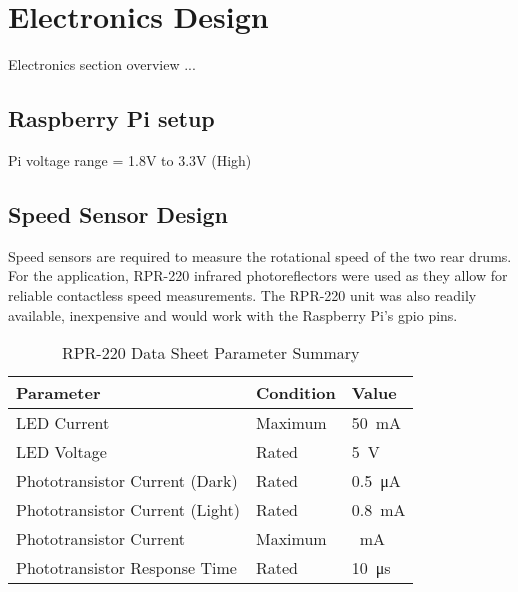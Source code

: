 \newpage

\chapter{Electronics Design}

Electronics section overview ...

\newpage

\section{Raspberry Pi setup}

Pi voltage range = 1.8V to 3.3V (High)

\newpage

\section{Speed Sensor Design}

Speed sensors are required to measure the rotational speed of the two rear drums. For the application, RPR-220 infrared photoreflectors were used as they allow for reliable contactless speed measurements. The RPR-220 unit was also readily available, inexpensive and would work with the Raspberry Pi's \acs{gpio} pins.

\begin{table}[H]
		\renewcommand{\arraystretch}{\tablestretch}
	\centering
	\caption{RPR-220 Data Sheet Parameter Summary}
	\citep{RPR:2015}
	\begin{tabularx}{\textwidth}{X >{\raggedright}p{3cm} >{\raggedright\arraybackslash}p{2cm} }
		\toprule
		Parameter                       & Condition & Value                   \\
		\midrule
		LED Current                     & Maximum   & \SI{50}{\milli\ampere}  \\
		LED Voltage                     & Rated     & \SI{5}{\volt}           \\
		Phototransistor Current (Dark)  & Rated     & \SI{0.5}{\micro\ampere} \\
		Phototransistor Current (Light) & Rated     & \SI{0.8}{\milli\ampere} \\
		Phototransistor Current         & Maximum   & \SI{}{\milli\ampere}    \\
		Phototransistor Response Time   & Rated     & \SI{10}{\micro\second}  \\
		\bottomrule
	\end{tabularx}
	\label{tab:rprdata}
\end{table}

